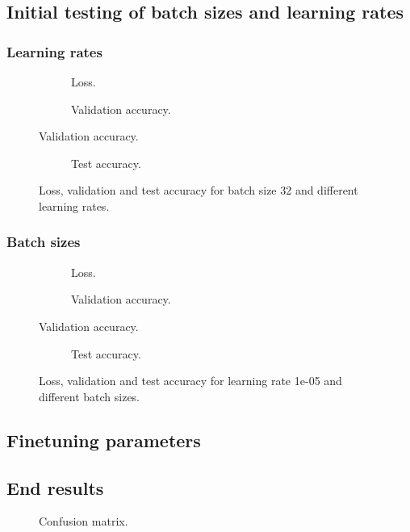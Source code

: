 \subsection{Initial testing of batch sizes and learning rates}

\subsubsection{Learning rates}

\begin{figure}
	\begin{subfigure}[b]{\textwidth}
		
		\caption{Loss.}
	\end{subfigure}

	\begin{subfigure}[b]{\textwidth}
		
		\caption{Validation accuracy.}
	\end{subfigure}
\end{figure}

\begin{figure}
	\ContinuedFloat
	\begin{subfigure}[b]{\textwidth}
		
		\caption{Test accuracy.}
	\end{subfigure}
	\caption{Loss, validation and test accuracy for batch size 32 and different learning rates.}
\end{figure}


\subsubsection{Batch sizes}

\begin{figure}
	\begin{subfigure}[b]{\textwidth}
		
		\caption{Loss.}
	\end{subfigure}

	\begin{subfigure}[b]{\textwidth}
		
		\caption{Validation accuracy.}
	\end{subfigure}
\end{figure}

\begin{figure}
	\ContinuedFloat
	\begin{subfigure}[b]{\textwidth}
		
		\caption{Test accuracy.}
	\end{subfigure}
	\caption{Loss, validation and test accuracy for learning rate 1e-05 and different batch sizes.}
\end{figure}


\subsection{Finetuning parameters}

\subsection{End results}

\begin{figure}
	
	\caption{Confusion matrix.}
\end{figure}
